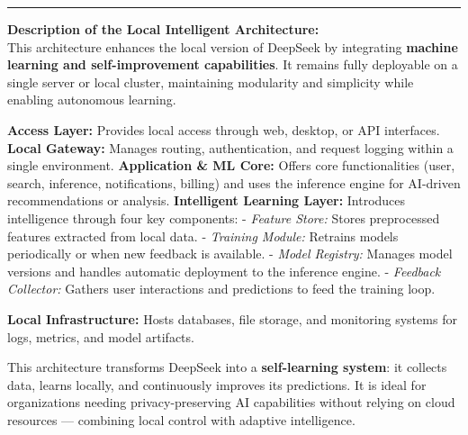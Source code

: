 \documentclass[a4paper,10pt]{article}
\begin{document}
\vspace{0.6cm}
\noindent\rule{\textwidth}{0.4pt}

\begin{minipage}{\textwidth}
\small
\textbf{Description of the Local Intelligent Architecture:}\\[0.3em]
This architecture enhances the local version of DeepSeek by integrating \textbf{machine learning and self-improvement capabilities}.  
It remains fully deployable on a single server or local cluster, maintaining modularity and simplicity while enabling autonomous learning.

\textbf{Access Layer:} Provides local access through web, desktop, or API interfaces.  
\textbf{Local Gateway:} Manages routing, authentication, and request logging within a single environment.  
\textbf{Application \& ML Core:} Offers core functionalities (user, search, inference, notifications, billing) and uses the inference engine for AI-driven recommendations or analysis.  
\textbf{Intelligent Learning Layer:} Introduces intelligence through four key components:
- \textit{Feature Store:} Stores preprocessed features extracted from local data.  
- \textit{Training Module:} Retrains models periodically or when new feedback is available.  
- \textit{Model Registry:} Manages model versions and handles automatic deployment to the inference engine.  
- \textit{Feedback Collector:} Gathers user interactions and predictions to feed the training loop.

\textbf{Local Infrastructure:} Hosts databases, file storage, and monitoring systems for logs, metrics, and model artifacts.

This architecture transforms DeepSeek into a \textbf{self-learning system}: it collects data, learns locally, and continuously improves its predictions.  
It is ideal for organizations needing privacy-preserving AI capabilities without relying on cloud resources — combining local control with adaptive intelligence.
\end{minipage}
\end{document}
